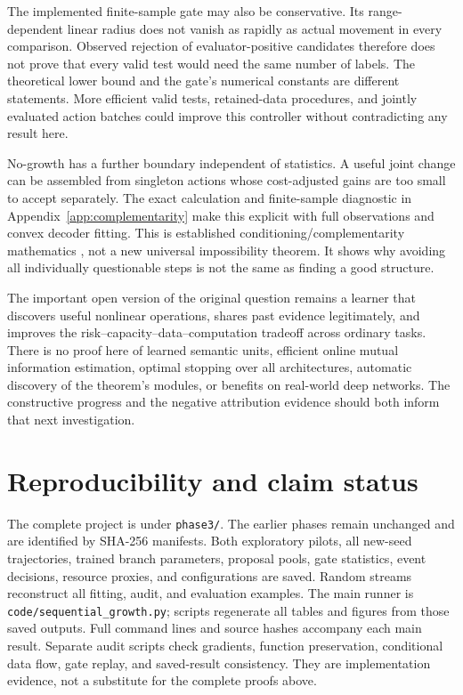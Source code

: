\documentclass[11pt]{article}
\theoremstyle{remark}\newtheorem{remark}[theorem]{Remark}
\begin{document}
The implemented finite-sample gate may also be conservative. Its
range-dependent linear radius does not vanish as rapidly as actual movement
in every comparison. Observed rejection of evaluator-positive candidates
therefore does not prove that every valid test would need the same number of
labels. The theoretical lower bound and the gate's numerical constants are
different statements. More efficient valid tests, retained-data procedures,
and jointly evaluated action batches could improve this controller without
contradicting any result here.

No-growth has a further boundary independent of statistics. A useful joint
change can be assembled from singleton actions whose cost-adjusted gains
are too small to accept separately. The exact calculation and finite-sample
diagnostic in Appendix~\ref{app:complementarity} make this explicit with
full observations and convex decoder fitting. This is established
conditioning/complementarity mathematics \cite{das2011submodular,elenberg2018restricted},
not a new universal impossibility theorem. It shows why avoiding all
individually questionable steps is not the same as finding a good structure.

The important open version of the original question remains a learner that
discovers useful nonlinear operations, shares past evidence legitimately,
and improves the risk--capacity--data--computation tradeoff across ordinary
tasks. There is no proof here of learned semantic units, efficient online
mutual information estimation, optimal stopping over all architectures,
automatic discovery of the theorem's modules, or benefits on real-world deep
networks. The constructive progress and the negative attribution evidence
should both inform that next investigation.

\section{Reproducibility and claim status}
The complete project is under \texttt{phase3/}. The earlier phases remain
unchanged and are identified by SHA-256 manifests. Both exploratory pilots,
all new-seed trajectories, trained branch parameters, proposal pools, gate
statistics, event decisions, resource proxies, and configurations are saved.
Random streams reconstruct all fitting, audit, and evaluation examples.
The main runner is \texttt{code/sequential\_growth.py}; scripts regenerate
all tables and figures from those saved outputs. Full command lines and
source hashes accompany each main result. Separate audit scripts check
gradients, function preservation, conditional data flow, gate replay, and
saved-result consistency. They are implementation evidence, not a substitute
for the complete proofs above.
\end{document}

